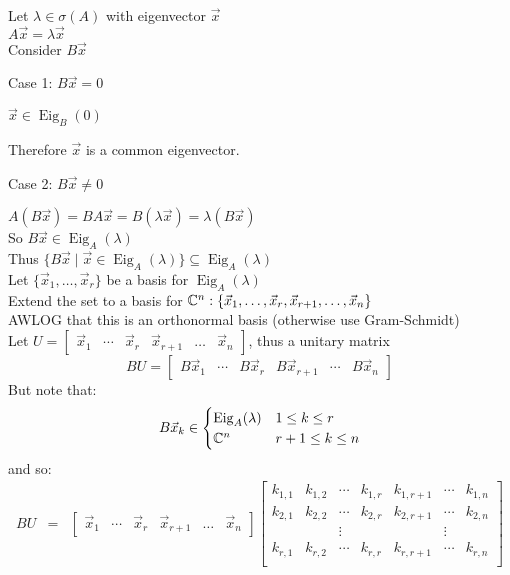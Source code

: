 \documentclass[letterpaper,12pt,fleqn]{article}
\renewcommand{\o}{\sigma}
\renewcommand{\l}{\lambda}
\newcommand{\vx}{\vec{x}}
\DeclareMathOperator{\Eig}{Eig}
\begin{document}
\begin{theproof}
  Let $\l\in\o(A)$ with eigenvector $\vx$ \\
  $A\vx=\l\vx$ \\
  Consider $B\vx$
  \begin{description}
  \item Case 1: $B\vx=0$

    $\vx\in\Eig_B(0)$

    Therefore $\vx$ is a common eigenvector.

  \item Case 2: $B\vx\ne0$

    $A(B\vx)=BA\vx=B(\l\vx)=\l(B\vx)$ \\
    So $B\vx\in\Eig_A(\l)$ \\
    Thus $\{B\vx\mid\vx\in\Eig_A(\l)\}\subseteq\Eig_A(\l)$ \\
    Let $\{\vx_1,\ldots,\vx_r\}$ be a basis for $\Eig_A(\l)$ \\
    Extend the set to a basis for $\C^n: \{\vx_1,\ldots,\vx_r,\vx_{r+1},\ldots,\vx_n\}$ \\
    AWLOG that this is an orthonormal basis (otherwise use Gram-Schmidt) \\
    Let $U=\begin{bmatrix} \vx_1 & \cdots & \vx_r & \vx_{r+1} & \ldots & \vx_n
    \end{bmatrix}$, thus a unitary matrix
    \[BU=\begin{bmatrix} B\vx_1 & \cdots & B\vx_r & B\vx_{r+1} & \cdots & B\vx_n
    \end{bmatrix}\]
    But note that:
    \[B\vx_k\in\begin{cases}
    \Eig_A(\l) & 1\le k\le r \\
    \C^n & r+1\le k\le n
    \end{cases}\]
    and so:
    \begin{eqnarray*}
      BU &=&
      \begin{bmatrix} \vx_1 & \cdots & \vx_r & \vx_{r+1} & \ldots & \vx_n\end{bmatrix}
        \begin{bmatrix}
          k_{1,1} & k_{1,2} & \cdots & k_{1,r} & k_{1,r+1} & \cdots & k_{1,n} \\
          k_{2,1} & k_{2,2} & \cdots & k_{2,r} & k_{2,r+1} & \cdots & k_{2,n} \\
          & & \vdots & & & \vdots & \\
          k_{r,1} & k_{r,2} & \cdots & k_{r,r} & k_{r,r+1} & \cdots & k_{r,n} \\

\end{bmatrix}
\end{eqnarray*}
\end{description}
\end{theproof}
\end{document}
